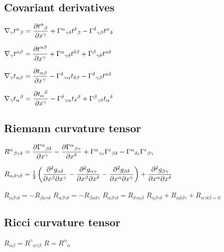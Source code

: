 		\subsection{Covariant derivatives}
\begin{itemize}
\itemt \( \nabla_\gamma t^\alpha{}_\beta = \dfrac{\partial t^\alpha{}_\beta}{\partial x^\gamma} + \Gamma^\alpha{}_{\gamma\delta}t^\delta{}_\beta - \Gamma^\delta{}_{\gamma\beta}t^\alpha{}_\delta \)

\itemt \( \nabla_\gamma t^{\alpha\beta} = \dfrac{\partial t^{\alpha\beta}}{\partial x^\gamma} + \Gamma^\alpha{}_{\gamma\delta}t^{\delta\beta} + \Gamma^\beta{}_{\gamma\delta}t^{\alpha{}\delta} \)

\itemt \( \nabla_\gamma t_{\alpha\beta} = \dfrac{\partial t_{\alpha\beta}}{\partial x^\gamma} - \Gamma^\delta{}_{\gamma\alpha}t_{\delta\beta} - \Gamma^\delta{}_{\gamma\beta}t^{\alpha\delta} \)

\itemt \( \nabla_\gamma t_\alpha{}^\beta = \dfrac{\partial t_\alpha{}^\beta}{\partial x^\gamma} - \Gamma^\delta{}_{\gamma\alpha}t_\delta{}^\beta + \Gamma^\beta{}_{\gamma\delta}t_\alpha{}^\delta \)
\end{itemize}

		\subsection{Riemann curvature tensor}
\begin{itemize}
\itemt \( R^\alpha{}_{\beta\gamma\delta} = \dfrac{\partial \Gamma^\alpha{}_{\beta\delta}}{\partial x^\gamma} - \dfrac{\partial \Gamma^\alpha{}_{\beta\gamma}}{\partial x^\delta} + \Gamma^\alpha{}_{\gamma\epsilon}\Gamma^\epsilon{}_{\beta\delta} - \Gamma^\alpha{}_{\delta\epsilon}\Gamma^\epsilon{}_{\beta\gamma} \)

\itemt \( R_{\alpha\beta\gamma\delta} = \frac{1}{2}\left(\dfrac{\partial ^2g_{\alpha\delta}}{\partial x^\beta \partial x^\gamma} - \dfrac{\partial ^2g_{\alpha\gamma}}{\partial x^\beta \partial x^\delta} - \dfrac{\partial ^2g_{\beta\delta}}{\partial x^\alpha \partial x^\gamma}\right) + \dfrac{\partial ^2g_{\beta\gamma}}{\partial x^\alpha \partial x^\delta}\)

\itemt \( R_{\alpha\beta\gamma\delta} = -R_{\beta\alpha\gamma\delta} \)
\itemt \( R_{\alpha\beta\gamma\delta} = -R_{\beta\alpha\delta\gamma} \)
\itemt \( R_{\alpha\beta\gamma\delta} = R_{\delta\gamma\alpha\beta} \)
\itemt \( R_{\alpha\beta\gamma\delta} + R_{\alpha\delta\beta\gamma} + R_{\alpha\gamma\delta\beta = 0}\)

\end{itemize}

		\subsection{Ricci curvature tensor}
\begin{itemize}
\itemt \( R_{\alpha\beta} = R^\gamma{}_{\alpha\gamma\beta} \)
\itemt \( R = R^\alpha{}_\alpha  \)
\end{itemize}


